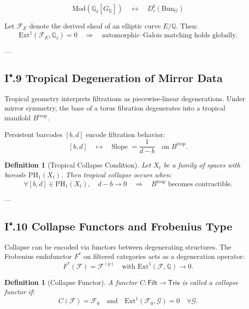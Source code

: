 \documentclass[11pt]{article}
\newtheorem{definition}[theorem]{Definition}
\begin{document}
\[
\text{Mod}(\mathbb{Q}_\ell[G_\mathbb{Q}]) \quad \longleftrightarrow \quad D^b_c(\mathrm{Bun}_G)
\]

\begin{proposition}
Let $\mathcal{F}_E$ denote the derived sheaf of an elliptic curve $E/\mathbb{Q}$.  
Then:
\[
\mathrm{Ext}^1(\mathcal{F}_E, \mathbb{Q}_\ell) = 0 
\quad \Longrightarrow \quad 
\text{automorphic–Galois matching holds globally}.
\]
\end{proposition}

---

\subsection*{I⁺.9 Tropical Degeneration of Mirror Data}

Tropical geometry interprets filtrations as piecewise-linear degenerations.  
Under mirror symmetry, the base of a torus fibration degenerates into a tropical manifold $B^{\mathrm{trop}}$.

Persistent barcodes $[b,d]$ encode filtration behavior:
\[
[b,d] \quad \mapsto \quad \text{Slope } = \frac{1}{d - b} \quad \text{on } B^{\mathrm{trop}}.
\]

\begin{definition}[Tropical Collapse Condition]
Let $X_t$ be a family of spaces with barcode $\mathrm{PH}_1(X_t)$.  
Then tropical collapse occurs when:
\[
\forall [b,d] \in \mathrm{PH}_1(X_t), \quad d - b \to 0 \quad \Rightarrow \quad B^{\mathrm{trop}} \text{ becomes contractible.}
\]
\end{definition}

---

\subsection*{I⁺.10 Collapse Functors and Frobenius Type}

Collapse can be encoded via functors between degenerating structures.  
The Frobenius endofunctor $F^*$ on filtered categories acts as a degeneration operator:
\[
F^*(\mathcal{F}) = \mathcal{F}^{(p)} \quad \text{with } \mathrm{Ext}^1(\mathcal{F}, \mathbb{Q}) \to 0.
\]

\begin{definition}[Collapse Functor]
A functor $C: \mathsf{Filt} \to \mathsf{Triv}$ is called a collapse functor if:
\[
C(\mathcal{F}) = \mathcal{F}_0 \quad \text{and} \quad \mathrm{Ext}^1(\mathcal{F}_0, \mathcal{G}) = 0 \quad \forall \mathcal{G}.
\]
\end{definition}
\end{document}
